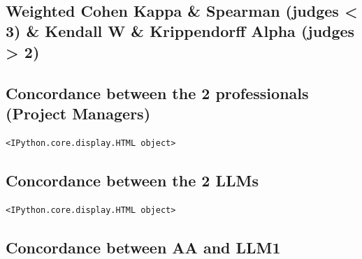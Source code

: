 \documentclass[11pt]{article}
\begin{document}
    \begin{center}
    \end{center}
    { \hspace*{\fill} \\}
    
    \subsection{Weighted Cohen Kappa \& Spearman (judges \textless{} 3) \&
Kendall W \& Krippendorff Alpha (judges \textgreater{}
2)}\label{weighted-cohen-kappa-spearman-judges-3-kendall-w-krippendorff-alpha-judges-2}

    \subsection{Concordance between the 2 professionals (Project
Managers)}\label{concordance-between-the-2-professionals-project-managers}

    
    \begin{Verbatim}[commandchars=\\\{\}]
<IPython.core.display.HTML object>
    \end{Verbatim}

    
    
    
    
    
    
    
    
    
    
    
    
    
    \subsection{Concordance between the 2
LLMs}\label{concordance-between-the-2-llms}

    
    \begin{Verbatim}[commandchars=\\\{\}]
<IPython.core.display.HTML object>
    \end{Verbatim}

    
    
    
    
    
    
    
    
    
    
    
    
    
    \subsection{Concordance between AA and
LLM1}\label{concordance-between-aa-and-llm1}
\end{document}
